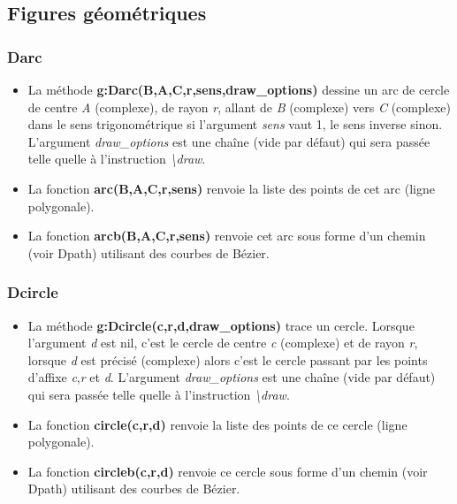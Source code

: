 \subsection{Figures géométriques}

\subsubsection{Darc}
\begin{itemize}
    \item La méthode \textbf{g:Darc(B,A,C,r,sens,draw\_options)} dessine un arc de cercle de centre \emph{A} (complexe), de rayon \emph{r}, allant de \emph{B} (complexe) vers \emph{C} (complexe) dans le sens trigonométrique si l'argument \emph{sens} vaut 1, le sens inverse sinon. L'argument \emph{draw\_options} est une chaîne (vide par défaut) qui sera passée telle quelle à l'instruction \emph{\textbackslash draw}.
    \item La fonction \textbf{arc(B,A,C,r,sens)} renvoie la liste des points de cet arc (ligne polygonale). 
    \item La fonction \textbf{arcb(B,A,C,r,sens)} renvoie cet arc sous forme d'un chemin (voir Dpath) utilisant des courbes de Bézier.
\end{itemize}

\subsubsection{Dcircle}
\begin{itemize}
    \item La méthode \textbf{g:Dcircle(c,r,d,draw\_options)} trace un cercle. Lorsque l'argument \emph{d} est nil, c'est le cercle de centre \emph{c} (complexe) et de rayon \emph{r}, lorsque \emph{d} est précisé (complexe) alors c'est le cercle passant par les points d'affixe \emph{c},\emph{r} et \emph{d}. L'argument \emph{draw\_options} est une chaîne (vide par défaut) qui sera passée telle quelle à l'instruction \emph{\textbackslash draw}.
  \item La fonction \textbf{circle(c,r,d)} renvoie la liste des points de ce cercle (ligne polygonale). 
  \item La fonction \textbf{circleb(c,r,d)} renvoie ce cercle sous forme d'un chemin (voir Dpath) utilisant des courbes de Bézier.
\end{itemize}

